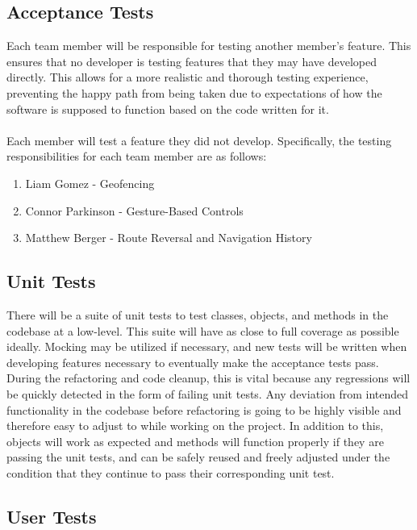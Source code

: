 \documentclass{scrreprt}
\begin{document}
\subsection{Acceptance Tests}
	Each team member will be responsible for testing another member's feature. This ensures that no developer is testing features that they may have developed directly. This allows for a more realistic and thorough testing experience, preventing the happy path from being taken due to expectations of how the software is supposed to function based on the code written for it.\\\\Each member will test a feature they did not develop. Specifically, the testing responsibilities for each team member are as follows:
	\begin{enumerate}
		\item Liam Gomez - Geofencing
		\item Connor Parkinson - Gesture-Based Controls
		\item Matthew Berger - Route Reversal and Navigation History
	\end{enumerate}
	
\pagebreak

\subsection{Unit Tests}

There will be a suite of unit tests to test classes, objects, and methods in the codebase at a low-level. This suite will have as close to full coverage as possible ideally. Mocking may be utilized if necessary, and new tests will be written when developing features necessary to eventually make the acceptance tests pass. During the refactoring and code cleanup, this is vital because any regressions will be quickly detected in the form of failing unit tests. Any deviation from intended functionality in the codebase before refactoring is going to be highly visible and therefore easy to adjust to while working on the project. In addition to this, objects will work as expected and methods will function properly if they are passing the unit tests, and can be safely reused and freely adjusted under the condition that they continue to pass their corresponding unit test.

\subsection{User Tests}
\end{document}
